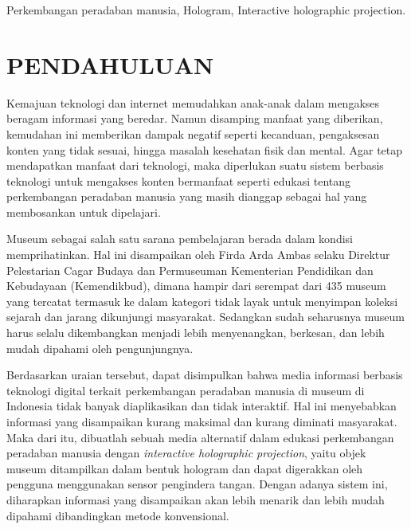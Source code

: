 \documentclass[conference]{IEEEtran}
\begin{document}
\begin{IEEEkeywords}
	Perkembangan peradaban manusia, Hologram, Interactive holographic projection.
\end{IEEEkeywords}
	
\section{PENDAHULUAN}
	Kemajuan teknologi dan internet memudahkan anak-anak dalam mengakses beragam informasi yang beredar. Namun disamping manfaat yang diberikan, kemudahan ini memberikan dampak negatif seperti kecanduan, pengaksesan konten yang tidak sesuai, hingga masalah kesehatan fisik dan mental\cite{sundus2018impact}. Agar tetap mendapatkan manfaat dari teknologi, maka diperlukan suatu sistem berbasis teknologi untuk mengakses konten bermanfaat seperti edukasi tentang perkembangan peradaban manusia yang masih dianggap sebagai hal yang membosankan untuk dipelajari\cite{wirawan_2018}. 
	
	Museum sebagai salah satu sarana pembelajaran berada dalam kondisi memprihatinkan. Hal ini disampaikan oleh Firda Arda Ambas selaku Direktur Pelestarian Cagar Budaya dan Permuseuman Kementerian Pendidikan dan Kebudayaan (Kemendikbud), dimana hampir dari serempat dari 435 museum yang tercatat termasuk ke dalam kategori tidak layak untuk menyimpan koleksi sejarah dan jarang dikunjungi masyarakat\cite{kemendikbud_2019}. Sedangkan sudah seharusnya museum harus selalu dikembangkan menjadi lebih menyenangkan, berkesan, dan lebih mudah dipahami  oleh pengunjungnya\cite{sheng2012study}. 
	
	Berdasarkan uraian tersebut, dapat disimpulkan bahwa media informasi berbasis teknologi digital terkait perkembangan peradaban manusia di museum di Indonesia tidak banyak diaplikasikan dan tidak interaktif. Hal ini menyebabkan informasi yang disampaikan kurang maksimal dan kurang diminati masyarakat. Maka dari itu, dibuatlah sebuah media alternatif dalam edukasi perkembangan peradaban manusia dengan \textit{interactive holographic projection}, yaitu objek museum  ditampilkan dalam bentuk hologram dan dapat digerakkan oleh pengguna menggunakan sensor pengindera tangan. Dengan adanya sistem ini, diharapkan informasi yang disampaikan akan lebih menarik dan lebih mudah dipahami dibandingkan metode konvensional.
	
\end{document}
